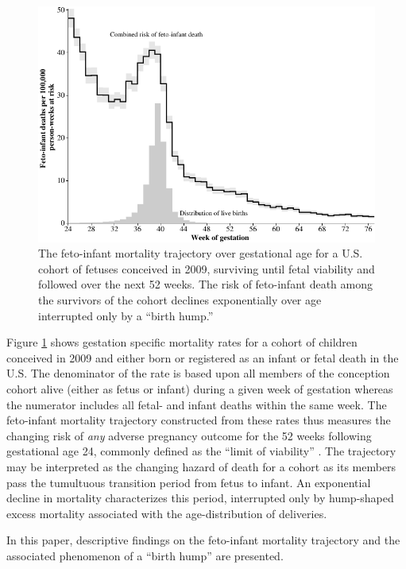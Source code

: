 \documentclass[10pt, twoside]{article}
\makeatletter
\def\cnstmaxfigwidth{
      \ifdim \Gin@nat@width>\linewidth
        \linewidth
      \else \Gin@nat@width
      \fi
    }
\let\Oldincludegraphics\includegraphics
\renewcommand{\includegraphics}[1]{\Oldincludegraphics[width=\cnstmaxfigwidth]{#1}}
\makeatother
\begin{document}
\begin{figure}
\centering
\includegraphics{fig/gestational_age_pattern.pdf}
\caption{\label{fig:gestational-age-pattern}The feto-infant mortality trajectory over gestational age for a U.S. cohort of fetuses conceived in 2009, surviving until fetal viability and followed over the next 52 weeks. The risk of feto-infant death among the survivors of the cohort declines exponentially over age interrupted only by a ``birth hump.''}
\end{figure}

Figure \ref{fig:gestational-age-pattern} shows gestation specific mortality rates for a cohort of children conceived in 2009 and either born or registered as an infant or fetal death in the U.S. The denominator of the rate is based upon all members of the conception cohort alive (either as fetus or infant) during a given week of gestation whereas the numerator includes all fetal- and infant deaths within the same week. The feto-infant mortality trajectory constructed from these rates thus measures the changing risk of \emph{any} adverse pregnancy outcome for the 52 weeks following gestational age 24, commonly defined as the ``limit of viability'' \citep{Seri2008}. The trajectory may be interpreted as the changing hazard of death for a cohort as its members pass the tumultuous transition period from fetus to infant. An exponential decline in mortality characterizes this period, interrupted only by hump-shaped excess mortality associated with the age-distribution of deliveries.

In this paper, descriptive findings on the feto-infant mortality trajectory and the associated phenomenon of a ``birth hump'' are presented.
\end{document}
